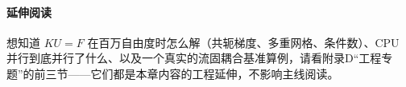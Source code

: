 \paragraph{延伸阅读}
想知道 $KU=F$ 在百万自由度时怎么解（共轭梯度、多重网格、条件数）、CPU 并行到底并行了什么、以及一个真实的流固耦合基准算例，请看附录D“工程专题”的前三节——它们都是本章内容的工程延伸，不影响主线阅读。
